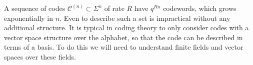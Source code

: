 \documentclass[../main.tex]{subfiles}
\begin{document}




A sequence of codes $\mathcal{C}^{(n)} \subset \Sigma^n$ of rate $R$ have $q^{Rn}$ codewords, which grows exponentially in $n$. Even to describe such a set is impractical without any additional structure. It is typical in coding theory to only consider codes with a vector space structure over the alphabet, so that the code can be described in terms of a basis. To do this we will need to understand finite fields and vector spaces over these fields.
\end{document}
